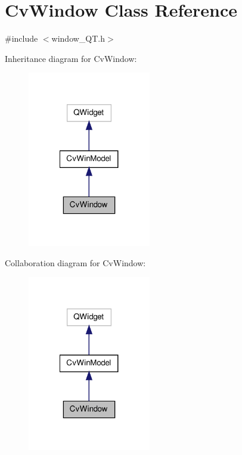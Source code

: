 \hypertarget{classCvWindow}{\section{Cv\-Window Class Reference}
\label{classCvWindow}
}


{\ttfamily \#include $<$window\-\_\-\-Q\-T.\-h$>$}



Inheritance diagram for Cv\-Window\-:\nopagebreak
\begin{figure}[H]
\begin{center}
\leavevmode
\includegraphics[width=152pt]{classCvWindow__inherit__graph}
\end{center}
\end{figure}


Collaboration diagram for Cv\-Window\-:\nopagebreak
\begin{figure}[H]
\begin{center}
\leavevmode
\includegraphics[width=152pt]{classCvWindow__coll__graph}
\end{center}
\end{figure}
